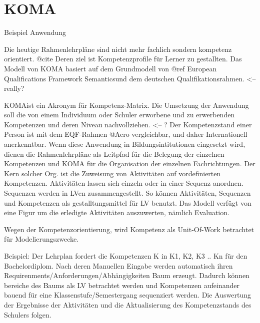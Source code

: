 \documentclass[
12pt,
english,
ngerman,
headsepline,
twoside,
openright,
numbers=noenddot,version=first
]{scrreprt}
\begin{document}



\section{KOMA}{Beispiel Anwendung}
\label{sec:KOMA}

Die heutige Rahmenlehrpläne sind nicht mehr fachlich sondern kompetenz orientiert. @cite Deren ziel ist Kompetenzprofile
für Lerner zu gestallten. Das Modell von KOMA basiert auf dem Grundmodell von
@ref \glqq European Qualifications Framework Semantics\grqq und dem deutschen Qualifikationsrahmen. <-- really?

\glqq KOMA\grqq ist ein Akronym für Kompetenz-Matrix. Die Umsetzung der Anwendung soll die von einem Individuum oder Schuler
erworbene und zu erwerbenden Kompetenzen und deren Niveau nachvollziehen. <-- ?
Der Kompetenzstand einer Person ist mit dem EQF-Rahmen @Acro vergleichbar, und daher Internationell anerkenntbar.
Wenn diese Anwendung in Bildungsintitutionen eingesetzt wird, dienen die Rahmenlehrpläne als Leitpfad für die Belegung der einzelnen Kompetenzen
und KOMA für die Organisation der einzelnen Fachrichtungen. Der Kern solcher Org. ist die Zuweisung von Aktivitäten auf vordefinierten Kompetenzen.
Aktivitäten lassen sich einzeln oder in einer Sequenz anordnen. Sequenzen werden in LVen zusammengestellt. So können Aktivitäten, Sequenzen und Kompetenzen
als gestalltungsmittel für LV benutzt. Das Modell verfügt von eine Figur um die erledigte Aktivitäten auszuwerten, nämlich Evaluation.

Wegen der Kompetenzorientierung, wird Kompetenz als Unit-Of-Work betrachtet für Modelierungszwecke.

Beispiel:
Der Lehrplan fordert die Kompetenzen K in K1, K2, K3 .. Kn für den Bachelordiplom. Nach deren Manuellen Eingabe werden automatisch
ihren Requirenments/Anforderungen/Abhängigkeiten Baum erzeugt. Dadurch können bereiche des Baums als LV betrachtet werden und Kompetenzen aufeinander
bauend für eine Klassenstufe/Semestergang sequenziert werden. Die Auswertung der Ergebnisse der Aktivitäten und die Aktualisierung des Kompetenzstands
des Schulers folgen.
\end{document}
